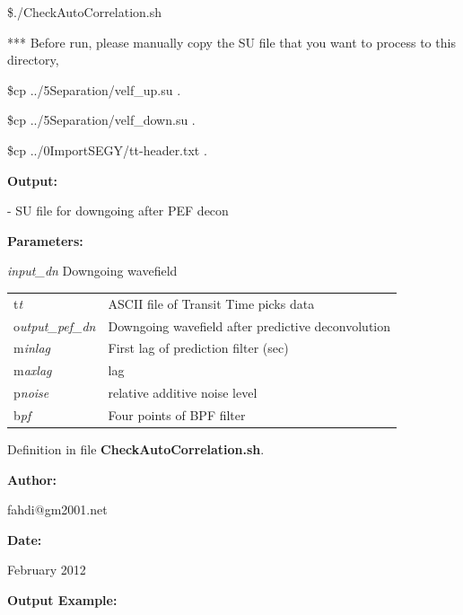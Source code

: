 \documentclass{article}
\begin{document}
\vspace{4pt}
\$./CheckAutoCorrelation.sh 

\vspace{16pt}
*** Before run, please manually copy the SU file that you want to process to this 
directory, 

\vspace{4pt}
\$cp ../5Separation/velf\_up.su .

\vspace{4pt}
\$cp ../5Separation/velf\_down.su .

\vspace{4pt}
\$cp ../0ImportSEGY/tt-header.txt .

\vspace{16pt}
\textbf{Output:}

\vspace{4pt}
- SU file for downgoing after PEF decon

\vspace{16pt}
\textbf{Parameters:}

\vspace{4pt}
\textit{input\_dn} Downgoing wavefield 

\vspace{4pt}
\begin{tabular}{|>{\raggedright}p{54pt}|>{\raggedright}p{245pt}|}
\hline
\tabularnewline
\hline
t\textit{t}  & ASCII file of Transit Time picks data \tabularnewline
\hline
o\textit{utput\_pef\_dn}  & Downgoing wavefield after predictive deconvolution 
\tabularnewline
\hline
m\textit{inlag}  & First lag of prediction filter (sec) \tabularnewline
\hline
m\textit{axlag}  & lag \tabularnewline
\hline
p\textit{noise}  & relative additive noise level \tabularnewline
\hline
b\textit{pf}  & Four points of BPF filter \tabularnewline
\hline
\end{tabular}

\vspace{1pt}
Definition in file \textbf{CheckAutoCorrelation.sh}.

\vspace{4pt}
\textbf{Author:}

\vspace{4pt}
\leftskip=18pt
fahdi@gm2001.net 

\vspace{4pt}
\leftskip=0pt
\textbf{Date:}

\vspace{4pt}
\leftskip=18pt
February 2012 \pagebreak{}

\vspace{4pt}
\leftskip=0pt
\textbf{Output Example:}
\end{document}
